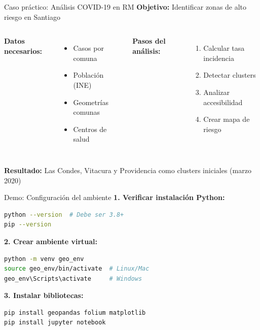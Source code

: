 \documentclass[10pt]{beamer}
\begin{document}
\begin{frame}{Caso práctico: Análisis COVID-19 en RM}
    \textbf{Objetivo:} Identificar zonas de alto riesgo en Santiago
    
    \begin{columns}
        \textbf{Datos necesarios:}
        \begin{itemize}
            \item Casos por comuna
            \item Población (INE)
            \item Geometrías comunas
            \item Centros de salud
        \end{itemize}
        
        \textbf{Pasos del análisis:}
        \begin{enumerate}
            \item Calcular tasa incidencia
            \item Detectar clusters
            \item Analizar accesibilidad
            \item Crear mapa de riesgo
        \end{enumerate}
    \end{columns}
    
    \vspace{0.3cm}
    \begin{tcolorbox}[colframe=red!50]
        \small
        \textbf{Resultado:} Las Condes, Vitacura y Providencia como clusters iniciales (marzo 2020)
    \end{tcolorbox}
\end{frame}

\begin{frame}[fragile]{Demo: Configuración del ambiente}
    \textbf{1. Verificar instalación Python:}
    \begin{lstlisting}[language=bash]
python --version  # Debe ser 3.8+
pip --version
    \end{lstlisting}
    
    \textbf{2. Crear ambiente virtual:}
    \begin{lstlisting}[language=bash]
python -m venv geo_env
source geo_env/bin/activate  # Linux/Mac
geo_env\Scripts\activate     # Windows
    \end{lstlisting}
    
    \textbf{3. Instalar bibliotecas:}
    \begin{lstlisting}[language=bash]
pip install geopandas folium matplotlib
pip install jupyter notebook
    \end{lstlisting}
\end{frame}
\end{document}
